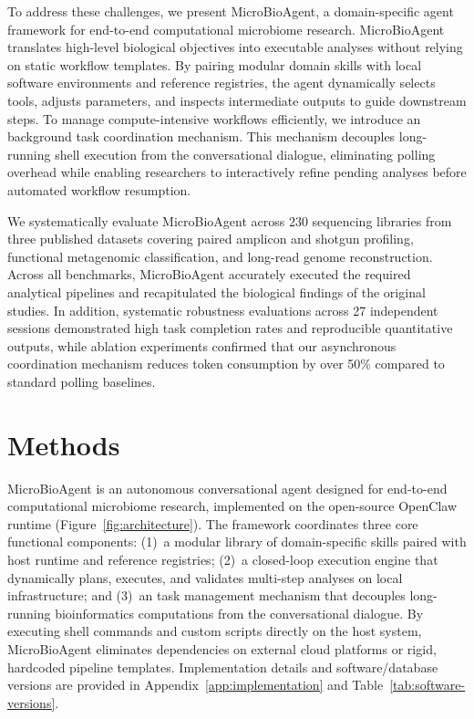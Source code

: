 \documentclass[10pt,letterpaper]{article}
\begin{document}
To address these challenges, we present MicroBioAgent, a domain-specific agent
framework for end-to-end computational microbiome research. MicroBioAgent
translates high-level biological objectives into executable analyses without
relying on static workflow templates. By pairing modular domain skills with
local software environments and reference registries, the agent dynamically
selects tools, adjusts parameters, and inspects intermediate outputs to guide
downstream steps. To manage compute-intensive workflows efficiently, we
introduce an background task coordination mechanism. This
mechanism decouples long-running shell execution from the conversational
dialogue, eliminating polling overhead while enabling researchers to
interactively refine pending analyses before automated workflow resumption.

We systematically evaluate MicroBioAgent across 230 sequencing libraries from
three published datasets covering paired amplicon and shotgun profiling,
functional metagenomic classification, and long-read genome reconstruction.
Across all benchmarks, MicroBioAgent accurately executed the required
analytical pipelines and recapitulated the biological findings of the original
studies. In addition, systematic robustness evaluations across 27 independent
sessions demonstrated high task completion rates and reproducible quantitative
outputs, while ablation experiments confirmed that our asynchronous
coordination mechanism reduces token consumption by over 50\% compared to
standard polling baselines.

\section{Methods}

MicroBioAgent is an autonomous conversational agent designed for end-to-end
computational microbiome research, implemented on the open-source OpenClaw
runtime (Figure~\ref{fig:architecture}). The framework coordinates three core
functional components: (1)~a modular library of domain-specific skills paired
with host runtime and reference registries; (2)~a closed-loop execution engine
that dynamically plans, executes, and validates multi-step analyses on local
infrastructure; and (3)~an task management mechanism that
decouples long-running bioinformatics computations from the conversational
dialogue. By executing shell commands and custom scripts directly on the host
system, MicroBioAgent eliminates dependencies on external cloud platforms or
rigid, hardcoded pipeline templates. Implementation details and software/database
versions are provided in Appendix~\ref{app:implementation} and
Table~\ref{tab:software-versions}.
\end{document}
